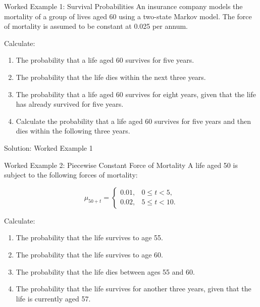 \documentclass[
  ignorenonframetext,
  aspectratio=169,
]{beamer}
\providecommand{\tightlist}{%
  \setlength{\itemsep}{0pt}\setlength{\parskip}{0pt}}
\begin{document}
\begin{frame}{Worked Example 1: Survival Probabilities}
\protect{}\label{worked-example-1-survival-probabilities}
An insurance company models the mortality of a group of lives aged 60
using a two-state Markov model. The force of mortality is assumed to be
constant at 0.025 per annum.

Calculate:

\begin{enumerate}
\tightlist
\item
  The probability that a life aged 60 survives for five years.
\item
  The probability that the life dies within the next three years.
\item
  The probability that a life aged 60 survives for eight years, given
  that the life has already survived for five years.
\item
  Calculate the probability that a life aged 60 survives for five years
  and then dies within the following three years.
\end{enumerate}
\end{frame}

\begin{frame}{Solution: Worked Example 1}
\protect{}\label{solution-worked-example-1}
\end{frame}

\begin{frame}{Worked Example 2: Piecewise Constant Force of Mortality}
\protect{}\label{worked-example-2-piecewise-constant-force-of-mortality}
A life aged 50 is subject to the following forces of mortality:

\[
\mu_{50+t}=
\begin{cases}
0.01, & 0\leq t<5,\\
0.02, & 5\leq t<10.
\end{cases}
\]

Calculate:

\begin{enumerate}
\tightlist
\item
  The probability that the life survives to age 55.
\item
  The probability that the life survives to age 60.
\item
  The probability that the life dies between ages 55 and 60.
\item
  The probability that the life survives for another three years, given
  that the life is currently aged 57.
\end{enumerate}
\end{frame}
\end{document}
